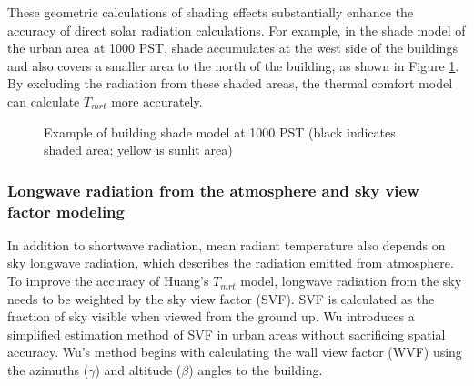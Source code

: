 \documentclass[preprint,3p,12pt,english]{elsarticle}
\begin{document}
These geometric calculations of shading effects substantially enhance the accuracy of direct solar radiation calculations. For example, in the shade model of the urban area at 1000 PST, shade accumulates at the west side of the buildings and also covers a smaller area to the north of the building, as shown in Figure \ref{Fig.ShadowExample}. By excluding the radiation from these shaded areas, the thermal comfort model can calculate $T_{mrt}$ more accurately. 

\begin{figure}[H]
\graphicspath{ {image/} }
\centering
{}
\caption{Example of building shade model at 1000 PST (black indicates shaded area; yellow is sunlit area)}
\label{Fig.ShadowExample}
\end{figure}


\subsubsection{Longwave radiation from the atmosphere and sky view factor modeling}
In addition to shortwave radiation, mean radiant temperature also depends on sky longwave radiation, which describes the radiation emitted from atmosphere. To improve the accuracy of Huang's $T_{mrt}$ model, longwave radiation from the sky needs to be weighted by the sky view factor (SVF). SVF is calculated as the fraction of sky visible when viewed from the ground up. Wu \cite{wu2013calculation} introduces a simplified estimation method of SVF in urban areas without sacrificing spatial accuracy. Wu’s method begins with calculating the wall view factor (WVF) using the azimuths ($\gamma$) and altitude ($\beta$) angles to the building.
\end{document}
